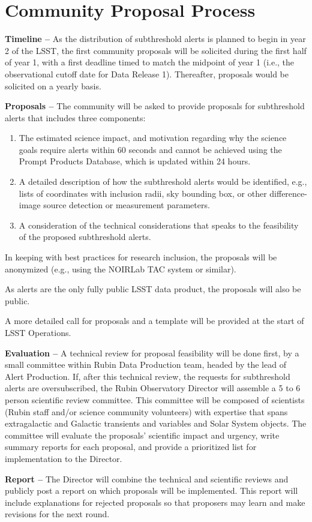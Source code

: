 \section{Community Proposal Process}\label{sec:process}

\textbf{Timeline --} As the distribution of subthreshold alerts is planned to begin in year 2 of the LSST, the first community proposals will be solicited during the first half of year 1, with a first deadline timed to match the midpoint of year 1 (i.e., the observational cutoff date for Data Release 1). Thereafter, proposals would be solicited on a yearly basis.

\textbf{Proposals --} The community will be asked to provide proposals for subthreshold alerts that includes three components:

\begin{enumerate}
\item The estimated science impact, and motivation regarding why the science goals require alerts within 60 seconds and cannot be achieved using the Prompt Products Database, which is updated within 24 hours.
\item A detailed description of how the subthreshold alerts would be identified, e.g., lists of coordinates with inclusion radii, sky bounding box, or other difference-image source detection or measurement parameters.
\item A consideration of the technical considerations that speaks to the feasibility of the proposed subthreshold alerts.
\end{enumerate}

In keeping with best practices for research inclusion, the proposals will be anonymized (e.g., using the NOIRLab TAC system or similar).

As alerts are the only fully public LSST data product, the proposals will also be public.

A more detailed call for proposals and a template will be provided at the start of LSST Operations.

\textbf{Evaluation --} A technical review for proposal feasibility will be done first, by a small committee within Rubin Data Production team, headed by the lead of Alert Production. If, after this technical review, the requests for subthreshold alerts are oversubscribed, the Rubin Observatory Director will assemble a 5 to 6 person scientific review committee. This committee will be composed of scientists (Rubin staff and/or science community volunteers) with expertise that spans extragalactic and Galactic transients and variables and Solar System objects. The committee will evaluate the proposals' scientific impact and urgency, write summary reports for each proposal, and provide a prioritized list for implementation to the Director.

\textbf{Report --} The Director will combine the technical and scientific reviews and publicly post a report on which proposals will be implemented. This report will include explanations for rejected proposals so that proposers may learn and make revisions for the next round.
